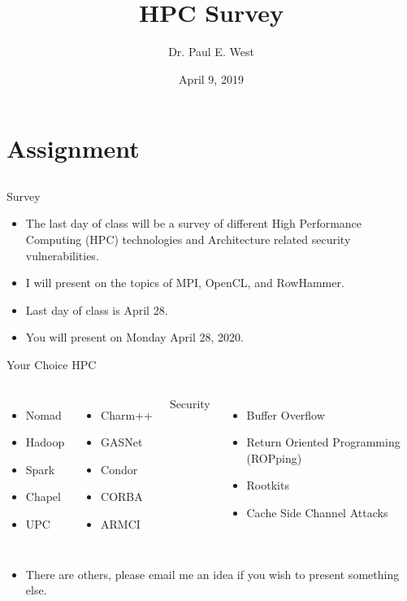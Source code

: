 \documentclass{beamer}
\title{HPC Survey}
\author{Dr. Paul E. West}
\institute{
  Department of Computer Science\\
  Charleston Southern University
}
\date{April 9, 2019}
\begin{document}
\begin{frame}
  \titlepage
\end{frame}

\section{Assignment}
\subsection{}
\begin{frame}{Survey}
\begin{itemize}
\item The last day of class will be a survey of different High Performance Computing (HPC) technologies and Architecture related security vulnerabilities.
\item I will present on the topics of MPI, OpenCL, and RowHammer.
\item Last day of class is April 28.
\item You will present on Monday April 28, 2020.
\end{itemize}
\end{frame}

\begin{frame}{Your Choice}
HPC
\begin{columns}[c]
\begin{itemize}
\item Nomad
\item Hadoop
\item Spark
\item Chapel
\item UPC
\end{itemize}
\begin{itemize}
\item Charm++
\item GASNet
\item Condor
\item CORBA
\item ARMCI
\end{itemize}
Security
\begin{itemize}
\item Buffer Overflow
\item Return Oriented Programming (ROPping)
\item Rootkits
\item Cache Side Channel Attacks
\end{itemize}
\end{columns}
\begin{itemize}
\item There are others, please email me an idea if you wish to present something else.
\end{itemize}
\end{frame}
\end{document}

